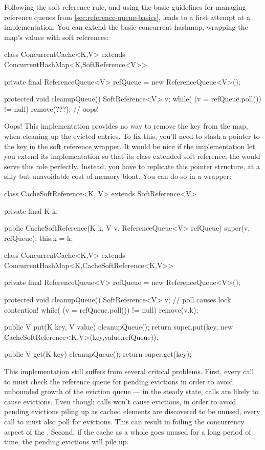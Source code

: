 Following the soft reference rule, and using the basic guidelines for managing
reference queues from \autoref{sec:reference-queue-basics}, leads to a first
attempt at a  implementation. You can extend the basic
concurrent hashmap, wrapping the map's values with soft references:
\begin{shortlisting}
class ConcurrentCache<K,V> extends ConcurrentHashMap<K,SoftReference<V>> {
   private final ReferenceQueue<V> refQueue = new ReferenceQueue<V>();
   
   protected void cleanupQueue() {
      SoftReference<V> v;
      while( (v = refQueue.poll()) != null) {
         remove(???); // oops!
      }
   }
}
\end{shortlisting}
Oops! This implementation provides no way to remove the key from the map, when
cleaning up the evicted entries. To fix this, you'll need to stash a pointer to
the key in the soft reference wrapper. It would be nice if the
 implementation let you extend
its implementation so that its  class extended soft reference;
the  would serve this role perfectly. Instead, you have to
replicate this pointer structure, at a silly but unavoidable cost of memory
bloat. You can do so in a  wrapper:
\begin{shortlisting}
class CacheSoftReference<K, V> extends SoftReference<V> {
   private final K k;
   
   public CacheSoftReference(K k, V v, ReferenceQueue<V> refQueue) {
      super(v, refQueue);
      this.k = k;
   }
}

class ConcurrentCache<K,V> extends ConcurrentHashMap<K,CacheSoftReference<K,V>> {
   private final ReferenceQueue<V> refQueue = new ReferenceQueue<V>();
   
   protected void cleanupQueue() {
      SoftReference<V> v;
      // poll causes lock contention!
      while( (v = refQueue.poll()) != null) {
         remove(v.k);
      }
   }
   
   public V put(K key, V value) {
      cleanupQueue();
      return super.put(key, new CacheSoftReference<K,V>(key,value,refQueue));
   }
   
   public V get(K key) {
      cleanupQueue();
      return super.get(key);
   }
}
\end{shortlisting}
This implementation still suffers from several critical problems. First, every
call to  must check the reference queue for pending evictions in order
to avoid unbounded growth of the eviction queue --- in the steady state,
 calls are likely to cause evictions. Even though  calls
won't cause evictions, in order to avoid pending evictions piling up as cached
elements are discovered to be unused, every call to  must also poll for
evictions. This can result in foiling the concurrency aspect of the
. Second, if the cache as a whole goes unused for a long
period of time, the pending evictions will pile up.

